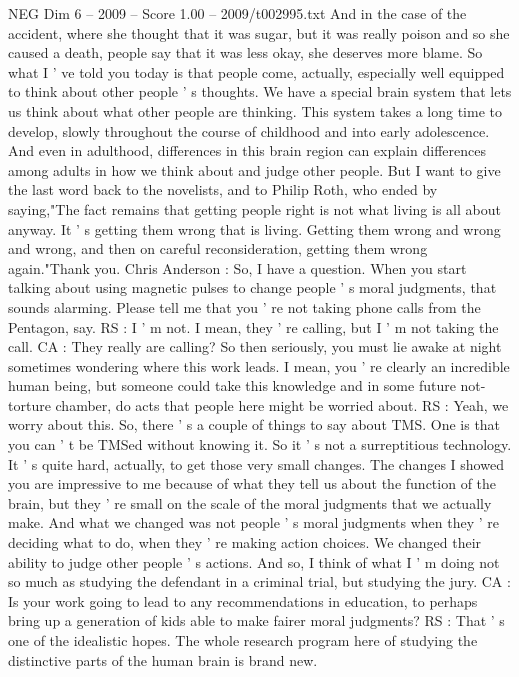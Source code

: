 \begin{textsample}{NEG Dim 6 – 2009 – Score 1.00 – 2009/t002995.txt}
And in the case of the accident, where she thought that it was sugar, but it was really poison and so she caused a death, people say that it was less okay, she deserves more blame.
So what I ' ve told you today is that people come, actually, especially well equipped to think about other people ' s thoughts.
We have a special brain system that lets us think about what other people are thinking.
This system takes a long time to develop, slowly throughout the course of childhood and into early adolescence.
And even in adulthood, differences in this brain region can explain differences among adults in how we think about and judge other people.
But I want to give the last word back to the novelists, and to Philip Roth, who ended by saying,"The fact remains that getting people right is not what living is all about anyway.
It ' s getting them wrong that is living.
Getting them wrong and wrong and wrong, and then on careful reconsideration, getting them wrong again."Thank you.
Chris Anderson : So, I have a question.
When you start talking about using magnetic pulses to change people ' s moral judgments, that sounds alarming.
Please tell me that you ' re not taking phone calls from the Pentagon, say.
RS : I ' m not.
I mean, they ' re calling, but I ' m not taking the call.
CA : They really are calling?
So then seriously, you must lie awake at night sometimes wondering where this work leads.
I mean, you ' re clearly an incredible human being, but someone could take this knowledge and in some future not- torture chamber, do acts that people here might be worried about.
RS : Yeah, we worry about this.
So, there ' s a couple of things to say about TMS.
One is that you can ' t be TMSed without knowing it.
So it ' s not a surreptitious technology.
It ' s quite hard, actually, to get those very small changes.
The changes I showed you are impressive to me because of what they tell us about the function of the brain, but they ' re small on the scale of the moral judgments that we actually make.
And what we changed was not people ' s moral judgments when they ' re deciding what to do, when they ' re making action choices.
We changed their ability to judge other people ' s actions.
And so, I think of what I ' m doing not so much as studying the defendant in a criminal trial, but studying the jury.
CA : Is your work going to lead to any recommendations in education, to perhaps bring up a generation of kids able to make fairer moral judgments?
RS : That ' s one of the idealistic hopes.
The whole research program here of studying the distinctive parts of the human brain is brand new.

\end{textsample}
